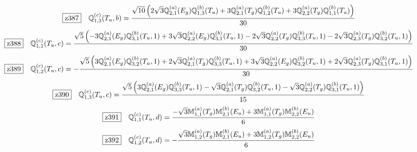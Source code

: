 \documentclass[fleqn,10pt,landscape]{jsarticle}
\begin{document}
\begin{dmath*}
\hspace*{3mm}\fbox{z387}\quad \mathbb{Q}_{1,3}^{(c)}(T_{u},b)=\frac{\sqrt{10} \left(2 \sqrt{3} \mathbb{Q}_{2,1}^{(a)}(E_{g}) \mathbb{Q}_{1,3}^{(b)}(T_{u}) + 3 \mathbb{Q}_{2,1}^{(a)}(T_{g}) \mathbb{Q}_{1,2}^{(b)}(T_{u}) + 3 \mathbb{Q}_{2,2}^{(a)}(T_{g}) \mathbb{Q}_{1,1}^{(b)}(T_{u})\right)}{30}
\end{dmath*}
\begin{dmath*}
\hspace*{3mm}\fbox{z388}\quad \mathbb{Q}_{1,1}^{(c)}(T_{u},c)=\frac{\sqrt{5} \left(- 3 \mathbb{Q}_{2,1}^{(a)}(E_{g}) \mathbb{Q}_{3,1}^{(b)}(T_{u},1) + 3 \sqrt{3} \mathbb{Q}_{2,2}^{(a)}(E_{g}) \mathbb{Q}_{3,1}^{(b)}(T_{u},1) - 2 \sqrt{3} \mathbb{Q}_{2,2}^{(a)}(T_{g}) \mathbb{Q}_{3,3}^{(b)}(T_{u},1) - 2 \sqrt{3} \mathbb{Q}_{2,3}^{(a)}(T_{g}) \mathbb{Q}_{3,2}^{(b)}(T_{u},1)\right)}{30}
\end{dmath*}
\begin{dmath*}
\hspace*{3mm}\fbox{z389}\quad \mathbb{Q}_{1,2}^{(c)}(T_{u},c)=- \frac{\sqrt{5} \left(3 \mathbb{Q}_{2,1}^{(a)}(E_{g}) \mathbb{Q}_{3,2}^{(b)}(T_{u},1) + 2 \sqrt{3} \mathbb{Q}_{2,1}^{(a)}(T_{g}) \mathbb{Q}_{3,3}^{(b)}(T_{u},1) + 3 \sqrt{3} \mathbb{Q}_{2,2}^{(a)}(E_{g}) \mathbb{Q}_{3,2}^{(b)}(T_{u},1) + 2 \sqrt{3} \mathbb{Q}_{2,3}^{(a)}(T_{g}) \mathbb{Q}_{3,1}^{(b)}(T_{u},1)\right)}{30}
\end{dmath*}
\begin{dmath*}
\hspace*{3mm}\fbox{z390}\quad \mathbb{Q}_{1,3}^{(c)}(T_{u},c)=\frac{\sqrt{5} \left(3 \mathbb{Q}_{2,1}^{(a)}(E_{g}) \mathbb{Q}_{3,3}^{(b)}(T_{u},1) - \sqrt{3} \mathbb{Q}_{2,1}^{(a)}(T_{g}) \mathbb{Q}_{3,2}^{(b)}(T_{u},1) - \sqrt{3} \mathbb{Q}_{2,2}^{(a)}(T_{g}) \mathbb{Q}_{3,1}^{(b)}(T_{u},1)\right)}{15}
\end{dmath*}
\begin{dmath*}
\hspace*{3mm}\fbox{z391}\quad \mathbb{Q}_{1,1}^{(c)}(T_{u},d)=\frac{- \sqrt{3} \mathbb{M}_{1,1}^{(a)}(T_{g}) \mathbb{M}_{2,1}^{(b)}(E_{u}) + 3 \mathbb{M}_{1,1}^{(a)}(T_{g}) \mathbb{M}_{2,2}^{(b)}(E_{u})}{6}
\end{dmath*}
\begin{dmath*}
\hspace*{3mm}\fbox{z392}\quad \mathbb{Q}_{1,2}^{(c)}(T_{u},d)=- \frac{\sqrt{3} \mathbb{M}_{1,2}^{(a)}(T_{g}) \mathbb{M}_{2,1}^{(b)}(E_{u}) + 3 \mathbb{M}_{1,2}^{(a)}(T_{g}) \mathbb{M}_{2,2}^{(b)}(E_{u})}{6}
\end{dmath*}
\end{document}

